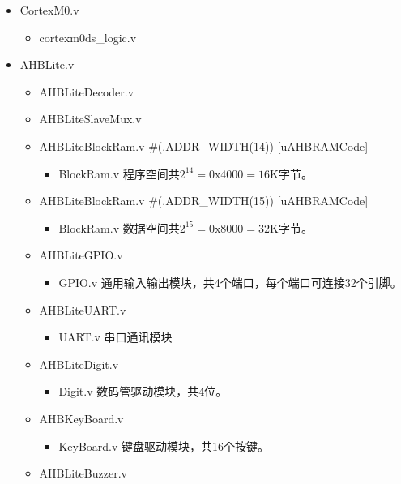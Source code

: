 \begin{itemize}
    \ttfamily%
    \item CortexM0.v 
    \begin{itemize}
        \item cortexm0ds\_logic.v
    \end{itemize}
    \item AHBLite.v 
    \begin{itemize}
        \item AHBLiteDecoder.v 
        \item AHBLiteSlaveMux.v 
        \item AHBLiteBlockRam.v \#(.ADDR\_WIDTH(14)) [uAHBRAMCode]
        \begin{itemize}
            \item BlockRam.v  \textnormal{\small 程序空间共$2^{14}=0\mathrm{x}4000=16\mathrm{K}$字节}。
        \end{itemize}
        \item AHBLiteBlockRam.v \#(.ADDR\_WIDTH(15)) [uAHBRAMCode]
        \begin{itemize}
            \item BlockRam.v  \textnormal{\small 数据空间共$2^{15}=0\mathrm{x}8000=32\mathrm{K}$字节}。
        \end{itemize}
        \item AHBLiteGPIO.v 
        \begin{itemize}
            \item GPIO.v  \textnormal{\small 通用输入输出模块，共4个端口，每个端口可连接32个引脚。}
        \end{itemize}
        \item AHBLiteUART.v 
        \begin{itemize}
            \item UART.v  \textnormal{\small 串口通讯模块}
        \end{itemize}
        \item AHBLiteDigit.v 
        \begin{itemize}
            \item Digit.v  \textnormal{\small 数码管驱动模块，共4位。}
        \end{itemize}
        \item AHBKeyBoard.v 
        \begin{itemize}
            \item KeyBoard.v  \textnormal{\small 键盘驱动模块，共16个按键。}
        \end{itemize}
        \item AHBLiteBuzzer.v 

\end{itemize}
\end{itemize}
